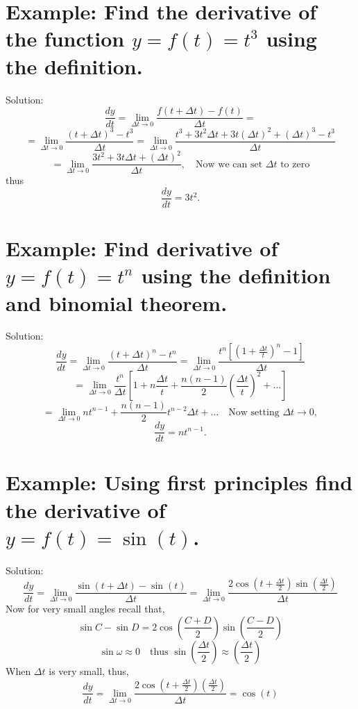 \documentclass[12pt]{article}
\begin{document}

\section*{Example: Find the derivative of the function \( y = f(t) = t^3 \) using the definition.}

Solution: 
\[
\frac{dy}{dt} = \lim_{\Delta t \to 0} \frac{f(t + \Delta t) - f(t)}{\Delta t} =
\]
\[
= \lim_{\Delta t \to 0} \frac{(t + \Delta t)^3 - t^3}{\Delta t} = \lim_{\Delta t \to 0} \frac{t^3 + 3t^2\Delta t + 3t(\Delta t)^2 + (\Delta t)^3 - t^3}{\Delta t}
\]
\[
= \lim_{\Delta t \to 0} \frac{3t^2 + 3t\Delta t + (\Delta t)^2}{\Delta t}, \quad \text{Now we can set } \Delta t \text{ to zero}
\]
thus
\[
\frac{dy}{dt} = 3t^2.
\]

\section*{Example: Find derivative of \( y = f(t) = t^n \) using the definition and binomial theorem.}

Solution: 
\[
\frac{dy}{dt} = \lim_{\Delta t \to 0} \frac{(t + \Delta t)^n - t^n}{\Delta t} = \lim_{\Delta t \to 0} \frac{t^n \left[ \left(1 + \frac{\Delta t}{t}\right)^n - 1 \right]}{\Delta t}
\]
\[
= \lim_{\Delta t \to 0} \frac{t^n}{\Delta t} \left[ 1 + n \frac{\Delta t}{t} + \frac{n(n-1)}{2} \left( \frac{\Delta t}{t} \right)^2 + \ldots \right]
\]
\[
= \lim_{\Delta t \to 0} nt^{n-1} + \frac{n(n-1)}{2} t^{n-2} \Delta t + \ldots \quad \text{Now setting } \Delta t \to 0,
\]
\[
\frac{dy}{dt} = nt^{n-1}.
\]

\section*{Example: Using first principles find the derivative of \( y = f(t) = \sin(t) \).}

Solution: 
\[
\frac{dy}{dt} = \lim_{\Delta t \to 0} \frac{\sin(t + \Delta t) - \sin(t)}{\Delta t} = \lim_{\Delta t \to 0} \frac{2\cos\left(t + \frac{\Delta t}{2}\right)\sin\left(\frac{\Delta t}{2}\right)}{\Delta t}
\]
Now for very small angles recall that,
\[
\sin C - \sin D = 2\cos\left(\frac{C+D}{2}\right)\sin\left(\frac{C-D}{2}\right)
\]
\[
\sin \omega \approx 0 \quad \text{thus } \sin\left(\frac{\Delta t}{2}\right) \approx \left(\frac{\Delta t}{2}\right)
\]
When \(\Delta t\) is very small, thus,
\[
\frac{dy}{dt} = \lim_{\Delta t \to 0} \frac{2\cos\left(t + \frac{\Delta t}{2}\right)\left(\frac{\Delta t}{2}\right)}{\Delta t} = \cos(t)
\]
\end{document}

